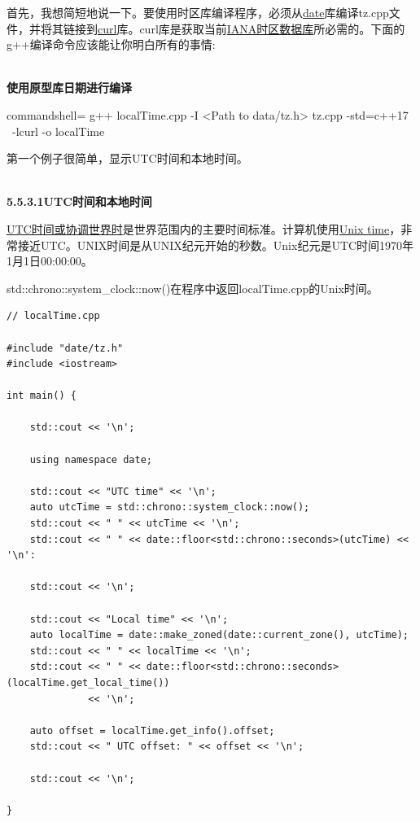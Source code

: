 \begin{tcolorbox}[breakable,enhanced jigsaw,colback=blue!5!white,colframe=blue!75!black,title={编译示例}]
	
首先，我想简短地说一下。要使用时区库编译程序，必须从\href{https://github.com/HowardHinnant/date}{date}库编译tz.cpp文件，并将其链接到\href{https://curl. se/}{curl}库。curl库是获取当前\href{https://www.iana.org/timezones}{IANA时区数据库}所必需的。下面的g++编译命令应该能让你明白所有的事情:

\hspace*{\fill} \\ %
\noindent
\textbf{使用原型库日期进行编译}
\begin{tcblisting}{commandshell={}}
g++ localTime.cpp -I <Path to data/tz.h> tz.cpp -std=c++17 \
  -lcurl -o localTime
\end{tcblisting}

\end{tcolorbox}

第一个例子很简单，显示UTC时间和本地时间。

\hspace*{\fill} \\ %
\noindent
\textbf{5.5.3.1\hspace{0.2cm}UTC时间和本地时间}

\href{https://en.wikipedia.org/wiki/Coordinated_Universal_Time}{UTC时间或协调世界时}是世界范围内的主要时间标准。计算机使用\href{https://en.wikipedia.org/wiki/Unix_time}{Unix time}，非常接近UTC。UNIX时间是从UNIX纪元开始的秒数。Unix纪元是UTC时间1970年1月1日00:00:00。

std::chrono::system\_clock::now()在程序中返回localTime.cpp的Unix时间。

\begin{lstlisting}[style=styleCXX]
// localTime.cpp

#include "date/tz.h"
#include <iostream>

int main() {

	std::cout << '\n';
	
	using namespace date;
	
	std::cout << "UTC time" << '\n';
	auto utcTime = std::chrono::system_clock::now();
	std::cout << " " << utcTime << '\n';
	std::cout << " " << date::floor<std::chrono::seconds>(utcTime) << '\n':
	
	std::cout << '\n';
	
	std::cout << "Local time" << '\n';
	auto localTime = date::make_zoned(date::current_zone(), utcTime);
	std::cout << " " << localTime << '\n';
	std::cout << " " << date::floor<std::chrono::seconds>(localTime.get_local_time())
	          << '\n';
	
	auto offset = localTime.get_info().offset;
	std::cout << " UTC offset: " << offset << '\n';

	std::cout << '\n';

}
\end{lstlisting}

